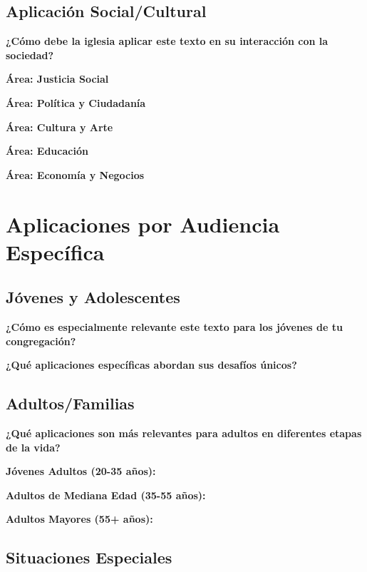 \documentclass[11pt,a4paper]{article}
\begin{document}
\subsection{Aplicación Social/Cultural}

\textbf{¿Cómo debe la iglesia aplicar este texto en su interacción con la sociedad?}

\textbf{Área: Justicia Social}
\vspace{2cm}

\textbf{Área: Política y Ciudadanía}
\vspace{2cm}

\textbf{Área: Cultura y Arte}
\vspace{2cm}

\textbf{Área: Educación}
\vspace{2cm}

\textbf{Área: Economía y Negocios}
\vspace{2cm}

\section{Aplicaciones por Audiencia Específica}

\subsection{Jóvenes y Adolescentes}

\textbf{¿Cómo es especialmente relevante este texto para los jóvenes de tu congregación?}
\vspace{3cm}

\textbf{¿Qué aplicaciones específicas abordan sus desafíos únicos?}
\vspace{3cm}

\subsection{Adultos/Familias}

\textbf{¿Qué aplicaciones son más relevantes para adultos en diferentes etapas de la vida?}

\textbf{Jóvenes Adultos (20-35 años):}
\vspace{2cm}

\textbf{Adultos de Mediana Edad (35-55 años):}
\vspace{2cm}

\textbf{Adultos Mayores (55+ años):}
\vspace{2cm}

\subsection{Situaciones Especiales}
\end{document}
